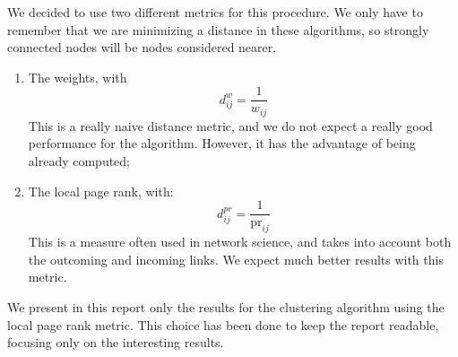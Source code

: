 We decided to use two different metrics for this procedure. We only have to remember that 
we are minimizing a distance in these algorithms, so strongly connected nodes will be 
nodes considered nearer. 
\begin{enumerate}
    \item The weights, with 
        $$d^{w}_{ij}=\frac{1}{w_{ij}}$$
        This is a really naive distance metric, and we do not expect a really good performance
        for the algorithm. However, it has the advantage of being already computed;
    \item The local page rank, with:
        $$d^{pr}_{ij}=\frac{1}{\mbox{pr}_{ij}}$$
        This is a measure often used in network science, and takes into account both the outcoming
        and incoming links. We expect much better results with this metric.
\end{enumerate}

We present in this report only the results for the clustering algorithm using the local page rank
metric. This choice has been done to keep the report readable, focusing only on the interesting
results.

